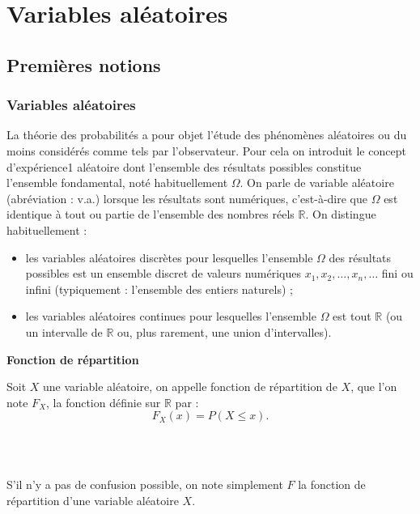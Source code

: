 \documentclass[../PolyS4.tex]{subfiles}
\begin{document}
\setcounter{chapter}{3}
\chapter{Variables aléatoires}


\section{Premières notions}
\subsection{ Variables al\' eatoires}
La th\'eorie des probabilit\' es a pour objet l'\' etude des ph\' enomènes al\' eatoires
ou du moins consid\' er\' es comme tels par l'observateur. Pour cela on introduit
le concept d'exp\' erience1 al\' eatoire dont l'ensemble des r\' esultats possibles
constitue l'ensemble fondamental, not\' e habituellement $\Omega$. On parle de variable
al\' eatoire (abr\' eviation : v.a.) lorsque les r\' esultats sont num\' eriques, c'est-à-dire
que  $\Omega$ est identique à tout ou partie de l'ensemble des nombres r\' eels $\mathbb{R}$.
On distingue habituellement :
\begin{itemize}
\item les variables al\' eatoires discrètes pour lesquelles l'ensemble  $\Omega$ des r\' esultats
possibles est un ensemble discret de valeurs num\' eriques $x_1, x_2, \dots, x_n, \dots$
fini ou infini (typiquement : l'ensemble des entiers naturels) ;
\item les variables al\' eatoires continues pour lesquelles l'ensemble  $\Omega$ est tout $\mathbb{R}$ (ou
un intervalle de $\mathbb{R}$ ou, plus rarement, une union d'intervalles).\\
\end{itemize}



\begin{Def}
{\textbf{Fonction de r\' epartition}}

Soit $X$ une variable al\'eatoire, on appelle fonction de répartition de $X$, que l'on note $F_X$, la fonction définie sur $\mathbb{R}$ par :
$$F_X(x) = P(X \leq x).$$
$\quad$
\end{Def}

\begin{Rmq}$\,$

S'il n'y a pas de confusion possible, on note simplement $F$ la fonction de répartition d'une variable aléatoire $X$.
\end{Rmq}
\end{document}

